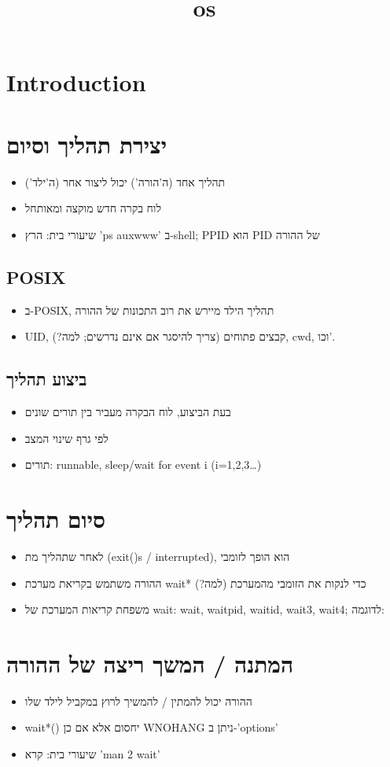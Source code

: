 \documentclass[12pt]{report}
\title{os}
\author{}
\begin{document}
\maketitle
\tableofcontents
\newpage

\section{Introduction}
  \section{יצירת תהליך וסיום}  \begin{itemize}  \item תהליך אחד (ה'הורה') יכול ליצור אחר (ה'ילד')  \item לוח בקרה חדש מוקצה ומאותחל  \item שיעורי בית: הרץ 'ps auxwww' ב-shell; PPID הוא PID של ההורה  \end{itemize}    \subsection{POSIX}  \begin{itemize}  \item ב-POSIX, תהליך הילד מיירש את רוב התכונות של ההורה  \item UID, קבצים פתוחים (צריך להיסגר אם אינם נדרשים; למה?), cwd, וכו'.  \end{itemize}    \subsection{ביצוע תהליך}  \begin{itemize}  \item בעת הביצוע, לוח הבקרה מעביר בין תורים שונים  \item לפי גרף שינוי המצב  \item תורים: runnable, sleep/wait for event i (i=1,2,3…)  \end{itemize}    \section{סיום תהליך}  \begin{itemize}  \item לאחר שתהליך מת (exit()s / interrupted), הוא הופך לזומבי  \item ההורה משתמש בקריאת מערכת wait* כדי לנקות את הזומבי מהמערכת (למה?)  \item משפחת קריאות המערכת של wait: wait, waitpid, waitid, wait3, wait4; לדוגמה:  \end{itemize}    \section{המתנה / המשך ריצה של ההורה}  \begin{itemize}  \item ההורה יכול להמתין / להמשיך לרוץ במקביל לילד שלו  \item wait*() יחסום אלא אם כן WNOHANG ניתן ב-'options'  \item שיעורי בית: קרא 'man 2 wait'  \end{itemize}  
\end{document}
